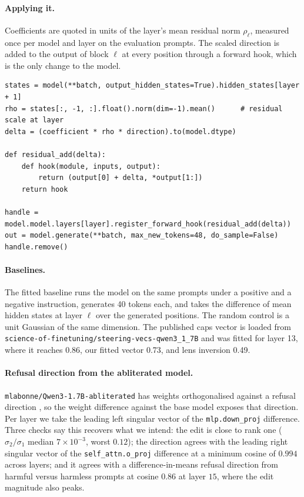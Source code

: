\documentclass{article}
\begin{document}
\paragraph{Applying it.}
Coefficients are quoted in units of the layer's mean residual norm $\rho_\ell$, measured once per model and layer on the evaluation prompts. The scaled direction is added to the output of block $\ell$ at every position through a forward hook, which is the only change to the model.

\begin{lstlisting}[caption={Scaling and injection during generation.},label={lst:hook}]
states = model(**batch, output_hidden_states=True).hidden_states[layer + 1]
rho = states[:, -1, :].float().norm(dim=-1).mean()      # residual scale at layer
delta = (coefficient * rho * direction).to(model.dtype)

def residual_add(delta):
    def hook(module, inputs, output):
        return (output[0] + delta, *output[1:])
    return hook

handle = model.model.layers[layer].register_forward_hook(residual_add(delta))
out = model.generate(**batch, max_new_tokens=48, do_sample=False)
handle.remove()
\end{lstlisting}

\paragraph{Baselines.}
The fitted baseline runs the model on the same prompts under a positive and a negative instruction, generates 40 tokens each, and takes the difference of mean hidden states at layer $\ell$ over the generated positions. The random control is a unit Gaussian of the same dimension. The published caps vector is loaded from \texttt{science-of-finetuning/steering-vecs-qwen3\_1\_7B} and was fitted for layer 13, where it reaches 0.86, our fitted vector 0.73, and lens inversion 0.49.

\paragraph{Refusal direction from the abliterated model.}
\texttt{mlabonne/Qwen3-1.7B-abliterated} has weights orthogonalised against a refusal direction \citep{arditi2024refusal}, so the weight difference against the base model exposes that direction. Per layer we take the leading left singular vector of the \texttt{mlp.down\_proj} difference. Three checks say this recovers what we intend: the edit is close to rank one ($\sigma_2/\sigma_1$ median $7 \times 10^{-3}$, worst $0.12$); the direction agrees with the leading right singular vector of the \texttt{self\_attn.o\_proj} difference at a minimum cosine of $0.994$ across layers; and it agrees with a difference-in-means refusal direction from harmful versus harmless prompts at cosine $0.86$ at layer $15$, where the edit magnitude also peaks.


\end{document}
